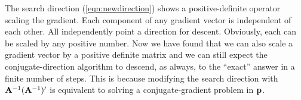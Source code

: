\par
The search direction (\ref{eqn:newdirection}) 
shows a positive-definite operator scaling the gradient.
Each component of any gradient vector is independent of each other.
All independently point a direction for descent.
Obviously, each can be scaled by any positive number.
Now we have found that we can also scale a gradient vector by
a positive definite matrix and we can still expect
the conjugate-direction algorithm to descend, as always,
to the ``exact'' answer in a finite number of steps.
This is because modifying the search direction with
$ \bold A^{-1} (\bold A^{-1})'$ is equivalent to solving
a conjugate-gradient problem in $\bold p$.


%




